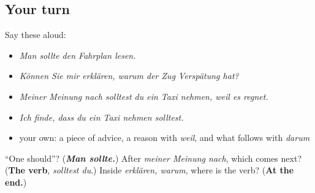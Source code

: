 \subsection*{Your turn}
Say these aloud:

\begin{itemize}
\raggedright
  \item \emph{Man sollte den Fahrplan lesen.}
  \item \emph{Können Sie mir erklären, warum der Zug Verspätung hat?}
  \item \emph{Meiner Meinung nach solltest du ein Taxi nehmen, weil es regnet.}
  \item \emph{Ich finde, dass du ein Taxi nehmen solltest.}
  \item your own: a piece of advice, a reason with \emph{weil}, and what follows with \emph{darum}
\end{itemize}

\begin{tcolorbox}[breakable,colback=teal!4,colframe=teal!35!black,title={Before you move on}]
\textquotedblleft{}One should\textquotedblright{}? (\emph{\textbf{Man sollte.}}) After \emph{meiner Meinung nach}, which comes next? (\textbf{The verb}, \emph{solltest du}.) Inside \emph{erklären, warum}, where is the verb? (\textbf{At the end.})
\end{tcolorbox}
